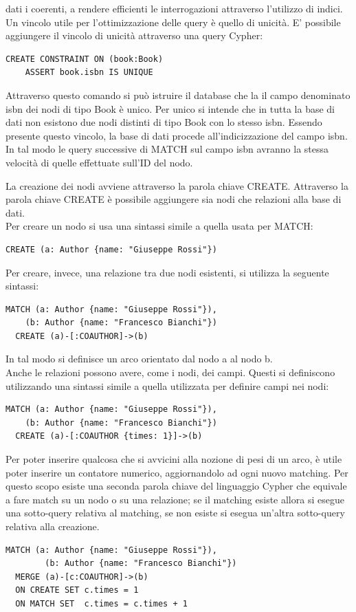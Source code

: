 \documentclass[a4paper,12pt]{article}
\begin{document}
dati i coerenti, a rendere efficienti le interrogazioni attraverso l'utilizzo
di indici.
Un vincolo utile per l'ottimizzazione delle query è quello di unicità. E'
possibile aggiungere il vincolo di unicità attraverso una query Cypher:
\begin{lstlisting}[keepspaces=true]
  CREATE CONSTRAINT ON (book:Book)
    ASSERT book.isbn IS UNIQUE
\end{lstlisting}
Attraverso questo comando si può istruire il database che la il campo denominato
isbn dei nodi di tipo Book è unico. Per unico si intende che in tutta la base di
dati non esistono due nodi distinti di tipo Book con lo stesso isbn. Essendo
presente questo vincolo, la base di dati procede all'indicizzazione del campo
isbn. In tal modo le query successive di MATCH sul campo isbn avranno la stessa
velocità di quelle effettuate sull'ID del nodo.
\par
La creazione dei nodi avviene attraverso la parola chiave CREATE. Attraverso la
parola chiave CREATE è possibile aggiungere sia nodi che relazioni alla base di
dati. \\
Per creare un nodo si usa una sintassi simile a quella usata per MATCH:
\begin{lstlisting}[keepspaces=true]
  CREATE (a: Author {name: "Giuseppe Rossi"})
\end{lstlisting}
Per creare, invece, una relazione tra due nodi esistenti, si utilizza la seguente
sintassi:
\begin{lstlisting}[keepspaces=true]
  MATCH (a: Author {name: "Giuseppe Rossi"}),
    (b: Author {name: "Francesco Bianchi"})
  CREATE (a)-[:COAUTHOR]->(b)
\end{lstlisting}
In tal modo si definisce un arco orientato dal nodo a al nodo b. \\
Anche le relazioni possono avere, come i nodi, dei campi. Questi si definiscono
utilizzando una sintassi simile a quella utilizzata per definire campi nei nodi:
\begin{lstlisting}[keepspaces=true]
  MATCH (a: Author {name: "Giuseppe Rossi"}),
    (b: Author {name: "Francesco Bianchi"})
  CREATE (a)-[:COAUTHOR {times: 1}]->(b)
\end{lstlisting}
Per poter inserire qualcosa che si avvicini alla nozione di pesi di un arco, è
utile poter inserire un contatore numerico, aggiornandolo ad ogni nuovo matching.
Per questo scopo esiste una seconda parola chiave del linguaggio Cypher che
equivale a fare match su un nodo o su una relazione; se il matching esiste allora
si esegue una sotto-query relativa al matching, se non esiste si esegua un'altra
sotto-query relativa alla creazione.
\begin{lstlisting}[keepspaces=true]
  MATCH (a: Author {name: "Giuseppe Rossi"}),
        (b: Author {name: "Francesco Bianchi"})
  MERGE (a)-[c:COAUTHOR]->(b)
  ON CREATE SET c.times = 1
  ON MATCH SET  c.times = c.times + 1
\end{lstlisting}
\end{document}
